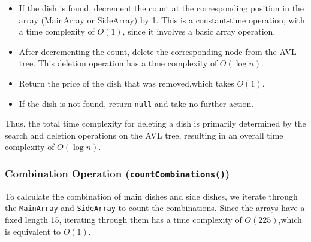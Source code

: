 \documentclass[12pt]{article}
\begin{document}
        \begin{itemize}
            \item If the dish is found, decrement the count at the corresponding position in the array (MainArray or SideArray) by 1. This is a constant-time operation, with a time complexity of \(O(1)\), since it involves a basic array operation.
            \item After decrementing the count, delete the corresponding node from the AVL tree. This deletion operation has a time complexity of \(O(\log n)\).
            \item Return the price of the dish that was removed,which takes $O(1)$.
            \item If the dish is not found, return \texttt{null} and take no further action.
        \end{itemize}

        Thus, the total time complexity for deleting a dish is primarily determined by the search and deletion operations on the AVL tree, resulting in an overall time complexity of \(O(\log n)\).


        \subsubsection*{Combination Operation (\texttt{countCombinations()})}
        To calculate the combination of main dishes and side dishes, we iterate through the \texttt{MainArray} and \texttt{SideArray} to count the combinations. Since the arrays have a fixed length 15, iterating through them has a time complexity of \(O(225)\),which is equivalent to 
        $O(1)$. 
\end{document}
